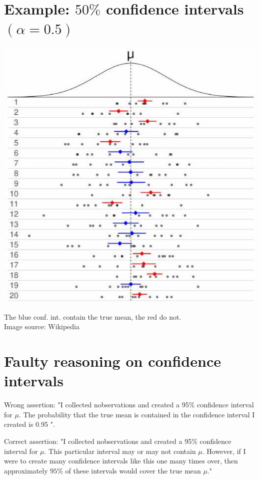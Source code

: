 \documentclass[10pt]{article}
\begin{document}
\section*{Example: $50 \%$ confidence intervals $(\alpha=0.5)$}
\begin{center}
\includegraphics[max width=\textwidth]{2025_05_12_520db7cd238ba7b44f0fg-22}
\end{center}

The blue conf. int. contain the true mean, the red do not.\\
Image source: Wikipedia

\section*{Faulty reasoning on confidence intervals}
Wrong assertion: "I collected nobservations and created a 95\% confidence interval for $\mu$. The probability that the true mean is contained in the confidence interval I created is 0.95 ".

Correct assertion: "I collected nobservations and created a 95\% confidence interval for $\mu$. This particular interval may or may not contain $\mu$. However, if I were to create many confidence intervals like this one many times over, then approximately $95 \%$ of these intervals would cover the true mean $\mu$."
\end{document}
